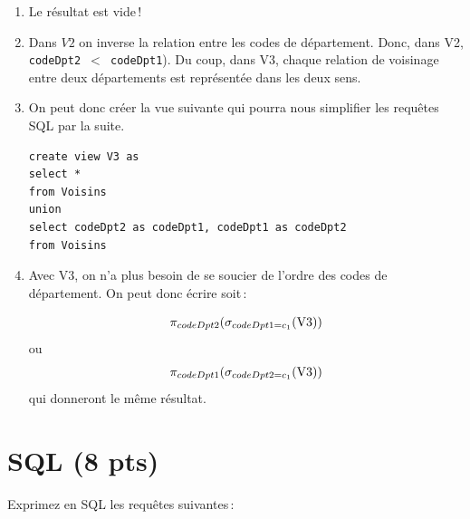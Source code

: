 \begin{solution}

\begin{enumerate} 
  \item Le résultat est vide\,!

  \item Dans $V2$ on inverse la relation entre les codes de département. Donc, dans V2,
     \texttt{codeDpt2  $<$ codeDpt1}). Du coup, dans V3, chaque relation de voisinage
     entre deux départements est représentée dans les deux sens.
  
  \item On peut donc créer la vue suivante qui pourra nous simplifier les requêtes SQL
     par la suite.
     
\begin{verbatim}
create view V3 as
select *
from Voisins 
union
select codeDpt2 as codeDpt1, codeDpt1 as codeDpt2
from Voisins
\end{verbatim}

   \item Avec V3, on n'a plus besoin de se soucier de l'ordre des codes de département.
     On peut donc écrire soit\,:
   
   $$\pi_{codeDpt2} (\sigma_{codeDpt1=c_1} (\rm{V3}))$$   
   ou
   $$\pi_{codeDpt1} (\sigma_{codeDpt2=c_1} (\rm{V3}))$$
   qui donneront le même résultat.

\end{enumerate}

\end{solution}


\section{SQL (8 pts)}

Exprimez en SQL les requêtes suivantes\,:

